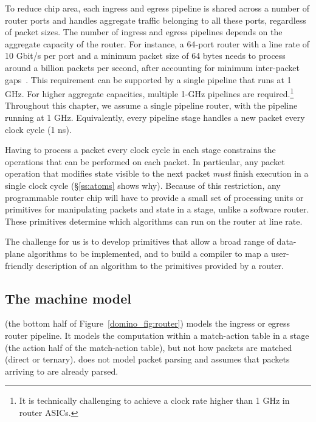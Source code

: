 To reduce chip area, each ingress and egress pipeline is shared across a number
of router ports and handles aggregate traffic belonging to all these ports,
regardless of packet sizes. The number of ingress and egress pipelines depends
on the aggregate capacity of the router. For instance, a 64-port router with a
line rate of 10 Gbit/s per port and a minimum packet size of 64 bytes needs to
process around a billion packets per second, after accounting for minimum
inter-packet gaps~\cite{rmt}.  This requirement can be supported by a single
pipeline that runs at 1 GHz.  For higher aggregate capacities, multiple 1-GHz
pipelines are required.\footnote{It is technically challenging to achieve a
clock rate higher than 1 GHz in router ASICs.} Throughout this chapter, we
assume a single pipeline router, with the pipeline running at 1 GHz.
Equivalently, every pipeline stage handles a new packet every clock cycle (1
ns).

Having to process a packet every clock cycle in each stage constrains the
operations that can be performed on each packet. In particular, any packet
operation that modifies state visible to the next packet {\em must} finish
execution in a single clock cycle (\S\ref{ss:atoms} shows why). Because of this
restriction, any programmable router chip will have to provide a small set of
processing units or primitives for manipulating packets and state in a stage,
unlike a software router. These primitives determine which algorithms can run
on the router at line rate.

The challenge for us is to develop primitives that allow a broad range of
data-plane algorithms to be implemented, and to build a compiler to map a
user-friendly description of an algorithm to the primitives provided by a
router.

\subsection{The \absmachine machine model}

\absmachine (the bottom half of Figure~\ref{domino_fig:router}) models the
ingress or egress router pipeline.  It models the computation within a
match-action table in a stage (\ie the action half of the match-action table),
but not how packets are matched (\eg direct or ternary). \absmachine does not
model packet parsing and assumes that packets arriving to \absmachine are
already parsed.

